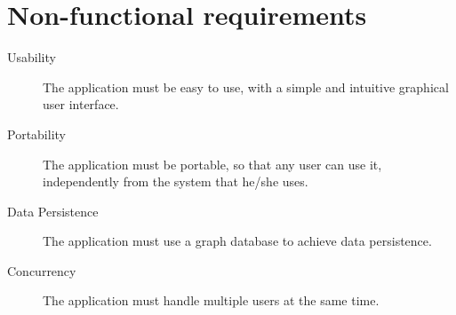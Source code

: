 \section{Non-functional requirements}\label{sec:nonfunctionalrequirements}

\begin{description}
	\item[Usability] The application must be easy to use, with a simple and
		intuitive graphical user interface.
	\item[Portability] The application must be portable, so that any user
		can use it, independently from the system that he/she uses.
	\item[Data Persistence] The application must use a graph database to
		achieve data persistence.
	\item[Concurrency] The application must handle multiple users at the
		same time.
\end{description}
